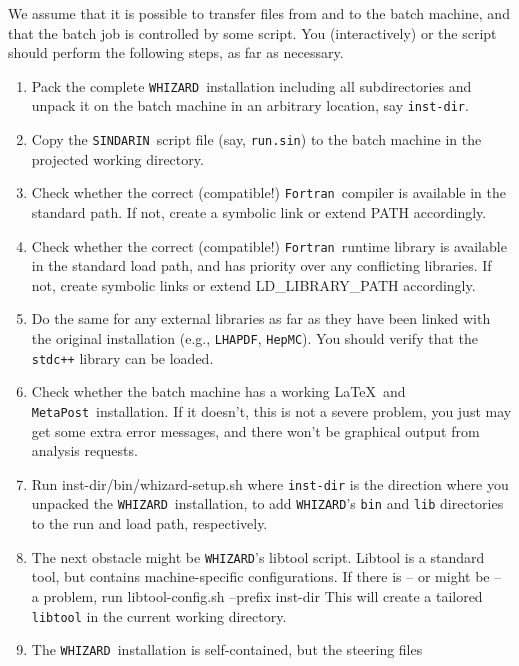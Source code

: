\documentclass[12pt]{book}
\newenvironment{interaction}%
  {\begingroup\small
   \verbatim}%
  {\endverbatim
   \endgroup\noindent}
\newcommand{\ttt}[1]{\texttt{#1}}
\newcommand{\whizard}{\texttt{WHIZARD}}
\newcommand{\lhapdf}{\texttt{LHAPDF}}
\newcommand{\hepmc}{\texttt{HepMC}}
\newcommand{\metapost}{\texttt{MetaPost}}
\newcommand{\sindarin}{\texttt{SINDARIN}}
\newcommand{\fortran}{\texttt{Fortran}}
\begin{document}
We assume that it is possible to transfer files from and to the batch
machine, and that the batch job is controlled by some script.  You
(interactively) or the script should perform the following steps, as
far as necessary.
\begin{enumerate}
\item
  Pack the complete \whizard\ installation including all
  subdirectories and unpack it on the batch machine in an arbitrary
  location, say \ttt{inst-dir}.
\item
  Copy the \sindarin\ script file (say, \ttt{run.sin}) to the batch
  machine in the projected working directory.
\item
  Check whether the correct (compatible!) \fortran\ compiler is
  available in the standard path.  If not, create a symbolic link or
  extend PATH accordingly.
\item
  Check whether the correct (compatible!) \fortran\ runtime library is
  available in the standard load path, and has priority over any
  conflicting libraries.  If not, create symbolic links or extend
  LD\_LIBRARY\_PATH accordingly.
\item
  Do the same for any external libraries as far as they have been
  linked with the original installation (e.g., \lhapdf,
  \hepmc).  You should verify that the \ttt{stdc++}
  library can be loaded.
\item
  Check whether the batch machine has a working \LaTeX\ and \metapost\
  installation.  If it doesn't, this is not a severe problem, you just
  may get some extra error messages, and there won't be
  graphical output from analysis requests.
\item
  Run
  \begin{interaction}
    inst-dir/bin/whizard-setup.sh
  \end{interaction}
  where \ttt{inst-dir} is the direction where you unpacked the
  \whizard\ installation, to add \whizard's \ttt{bin} and \ttt{lib}
  directories to the run and load path, respectively.
\item
  The next obstacle might be \whizard's libtool script.  Libtool is a
  standard tool, but contains machine-specific configurations.  If
  there is -- or might be -- a problem, run
  \begin{interaction}
    libtool-config.sh --prefix inst-dir    
  \end{interaction}
  This will create a tailored \ttt{libtool} in the current working
  directory.
\item
  The \whizard\ installation is self-contained, but the steering files

\end{enumerate}
\end{document}
